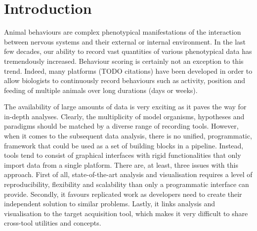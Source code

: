 \documentclass[10pt,letterpaper]{article}\usepackage[]{graphicx}\usepackage[]{color}
\begin{document}

\linenumbers

\section*{Introduction}

Animal behaviours are complex phenotypical manifestations of the interaction between nervous systems and their external or internal environment.
In the last few decades, our ability to record vast quantities of various phenotypical data has tremendously increased.
Behaviour scoring is certainly not an exception to this trend.
Indeed, many platforms (TODO citations) have been developed in order to allow biologists to continuously record behaviours such as activity, position and feeding of multiple animals over long durations (days or weeks).

The availability of large amounts of data is very exciting as it paves the way for in-depth analyses.
Clearly, the multiplicity of model organisms, hypotheses and paradigms should be matched by a diverse range of recording tools.
However, when it comes to the subsequent data analysis, there is no unified, programmatic, framework that could be used as a set of building blocks in a pipeline.
Instead, tools tend to consist of graphical interfaces with rigid functionalities that only import data from a single platform.
There are, at least, three issues with this approach.
First of all, state-of-the-art analysis and visualisation requires a level of reproducibility, flexibility and scalability than only a programmatic interface can provide.
Secondly, it favours replicated work as developers need to create their independent solution to similar problems.
Lastly, it links analysis and visualisation to the target acquisition tool, which makes it very difficult to share cross-tool utilities and concepts.
\end{document}
